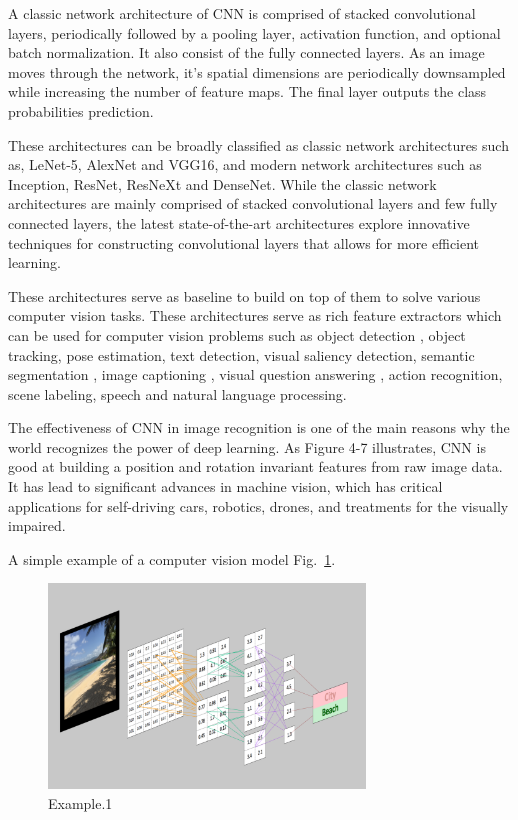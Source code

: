 A classic network architecture of CNN is comprised of stacked convolutional layers, periodically followed by a pooling layer, activation function, and optional batch normalization. It also consist of the fully connected layers. As an image moves through the network, it's spatial dimensions are periodically downsampled while increasing the number of feature maps. The final layer outputs the class probabilities prediction.

These architectures can be broadly classified as classic network architectures such as, LeNet-5, AlexNet and VGG16, and modern network architectures such as Inception, ResNet, ResNeXt and DenseNet. While the classic network architectures are mainly comprised of stacked convolutional layers and few fully connected layers, the latest state-of-the-art architectures explore innovative techniques for constructing convolutional layers that allows for more efficient learning.

These architectures serve as baseline to build on top of them to solve various computer vision tasks. These architectures serve as rich feature extractors which can be used for computer vision problems such as object detection \cite{edseee.690947520140101}, object tracking, pose estimation, text detection, visual saliency detection, semantic segmentation \cite{edseee.690947520140101}, image captioning \cite{edsarx.1411.455520140101} \cite{edsarx.1411.495220140101} \cite{edseee.778086320160101}, visual question answering \cite{edseee.741063620150101} \cite{edsarx.1505.0561220150101} \cite{Wongsuphasawat2018}, action recognition, scene labeling, speech and natural language processing. 

The effectiveness of CNN in image recognition is one of the main reasons why the world recognizes the power of deep learning. As Figure 4-7 illustrates, CNN is good at building a position and rotation invariant features from raw image data. It has lead to significant advances in machine vision, which has critical applications for self-driving cars, robotics, drones, and treatments for the visually impaired.

A simple example of a computer vision model Fig.~\ref{fig:CNN-2}.
\begin{figure}[htbp]
\centering
\includegraphics[width=0.75\textwidth]{images/CNN.png}
\caption{Example.1}
\label{fig:CNN-2}
\end{figure}

